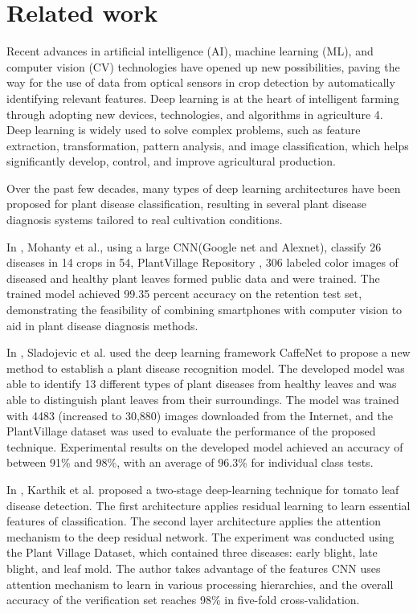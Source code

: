 \documentclass[a4paper,fleqn]{cas-sc}
\begin{document}
\section{Related work}
Recent advances in artificial intelligence (AI), machine learning (ML), and computer vision (CV) technologies have opened up new possibilities, paving the way for the use of data from optical sensors in crop detection by automatically identifying relevant features. Deep learning is at the heart of intelligent farming through adopting new devices, technologies, and algorithms in agriculture 4. Deep learning is widely used to solve complex problems, such as feature extraction, transformation, pattern analysis, and image classification, which helps significantly develop, control, and improve agricultural production. 

Over the past few decades, many types of deep learning architectures have been proposed for plant disease classification, resulting in several plant disease diagnosis systems tailored to real cultivation conditions. 

In \cite{prasanna2016using}, Mohanty et al., using a large CNN(Google net and Alexnet), classify 26 diseases in 14 crops in 54, PlantVillage Repository \cite{hughes2015open}, 306 labeled color images of diseased and healthy plant leaves formed public data and were trained. The trained model achieved 99.35 percent accuracy on the retention test set, demonstrating the feasibility of combining smartphones with computer vision to aid in plant disease diagnosis methods.

In \cite{sladojevic2016deep}, Sladojevic et al. used the deep learning framework CaffeNet to propose a new method to establish a plant disease recognition model. The developed model was able to identify 13 different types of plant diseases from healthy leaves and was able to distinguish plant leaves from their surroundings. The model was trained with 4483 (increased to 30,880) images downloaded from the Internet, and the PlantVillage dataset was used to evaluate the performance of the proposed technique. Experimental results on the developed model achieved an accuracy of between 91\% and 98\%, with an average of 96.3\% for individual class tests.

In \cite{karthik2020attention}, Karthik et al. proposed a two-stage deep-learning technique for tomato leaf disease detection. The first architecture applies residual learning to learn essential features of classification. The second layer architecture applies the attention mechanism to the deep residual network. The experiment was conducted using the Plant Village Dataset, which contained three diseases: early blight, late blight, and leaf mold. The author takes advantage of the features CNN uses attention mechanism to learn in various processing hierarchies, and the overall accuracy of the verification set reaches 98\% in five-fold cross-validation.
\end{document}
